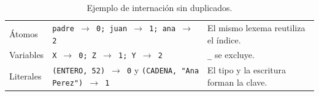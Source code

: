 \begin{table}[H]
\centering
\small
\caption{Ejemplo de internación sin duplicados.}
\label{tab:lexemas}
\begin{tabularx}{\textwidth}{L{2.5cm}YL{4.5cm}}
\toprule
{} &  &  \\
\midrule
Átomos & \texttt{padre $\rightarrow$ 0; juan $\rightarrow$ 1; ana $\rightarrow$ 2} & El mismo lexema reutiliza el índice. \\
 Variables & \texttt{X $\rightarrow$ 0; Z $\rightarrow$ 1; Y $\rightarrow$ 2} & \texttt{\_} se excluye. \\
Literales & \texttt{(ENTERO, 52) $\rightarrow$ 0} y \texttt{(CADENA, "Ana Perez") $\rightarrow$ 1} & El tipo y la escritura forman la clave. \\
\bottomrule
\end{tabularx}
\end{table}
